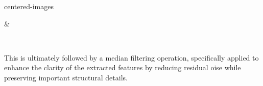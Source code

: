\documentclass[letterpaper,10pt,english]{sphinxmanual}
\begin{document}
\begin{sphinxuseclass}{centered-images}

\begin{savenotes}\sphinxattablestart
\sphinxthistablewithglobalstyle
\centering
\begin{tabular}[t]{}
\sphinxtoprule
\sphinxtableatstartofbodyhook

\begin{sphinxfigure-in-table}
\centering
\capstart
\noindent{}
\label{\detokenize{data:id14}}\end{sphinxfigure-in-table}\relax
&

\begin{sphinxfigure-in-table}
\centering
\capstart
\noindent{}
\label{\detokenize{data:id15}}\end{sphinxfigure-in-table}\relax
\\
\sphinxbottomrule
\end{tabular}
\sphinxtableafterendhook\par
\sphinxattableend\end{savenotes}

\end{sphinxuseclass}
\sphinxAtStartPar
This is ultimately followed by a median filtering operation, specifically
applied to enhance the clarity of the extracted features by reducing residual
oise while preserving important structural details.
\end{document}
